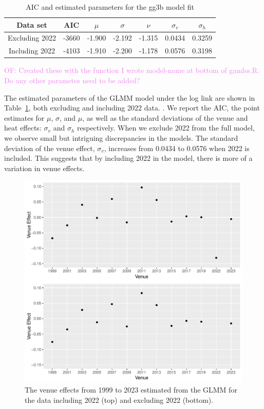 \documentclass[12pt, letterpaper]{article}
\newcommand{\of}[1]{\textcolor{violet}{OF: #1}}
\begin{document}
\begin{table}
  \centering
  \caption{AIC and estimated parameters for the gg3b model fit}
  \label{tab:Gamma_parameters}
  \begin{tabular}{c c c c c c c}
    \toprule
    Data set & AIC & $\mu$ & $\sigma$ & $\nu$ & $\sigma_v$ & $\sigma_h$ \\
    \midrule
    Excluding 2022 & -3660 & -1.900 & -2.192 & -1.315 & 0.0434 & 0.3259 \\
    Including 2022 & -4103 & -1.910 & -2.200 & -1.178 & 0.0576 & 0.3198 \\
    \bottomrule
  \end{tabular}
\end{table}
\of{Created these with the function I wrote model-name at bottom of gamlss.R. Do
any other parametes need to be added?}

The estimated parameters of the GLMM model under the log link are shown in 
Table~\ref{tab:Gamma_parameters}, both excluding and including 2022 data.
.  We report the AIC, the point estimates for $\mu$,
$\sigma$, and $\mu$, as well as the standard deviations of the venue and heat
effects: $\sigma_v$ and $\sigma_h$ respectively. When we exclude 2022 from the
full model, we observe small but intriguing discrepancies in the models. The
standard deviation of the venue effect, $\sigma_v$, increases from 0.0434 to
0.0576 when 2022 is included. This suggests that by including 2022 in the model,
there is more of a variation in venue effects.



\begin{figure}[tbp]
  \centering
  \includegraphics{ComparisonOfVenueEffects}
  \caption{The venue effects from 1999 to 2023 estimated from the GLMM for the
    data including 2022 (top) and excluding 2022 (bottom).}
  \label{fig:VenueEffects}
\end{figure}
\end{document}
